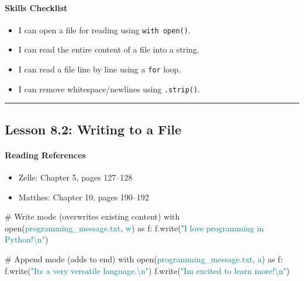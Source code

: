 \documentclass[
  justified,
  openright,
]{tufte-book}
\let\subsubsection\paragraph
\let\paragraph\paragraph
\newcommand{\BuiltInTok}[1]{#1}
\newcommand{\CharTok}[1]{\textcolor{Teal}{#1}}
\newcommand{\CommentTok}[1]{\textcolor{MidGray}{#1}}
\newcommand{\ControlFlowTok}[1]{\textcolor{BrandBlue}{#1}}
\newcommand{\ImportTok}[1]{\textcolor{BrandAccent}{#1}}
\newcommand{\NormalTok}[1]{#1}
\newcommand{\StringTok}[1]{\textcolor{Teal}{#1}}
\newenvironment{Shaded}{%
  \begin{snugshade}
}{%
  \end{snugshade}
}
\let\subsubsection\paragraph
\let\paragraph\paragraph
\providecommand{\tightlist}{%
  \setlength{\itemsep}{0pt}\setlength{\parskip}{0pt}}
\begin{document}
\subsubsection{Skills Checklist}\label{skills-checklist-37}

\begin{itemize}
\tightlist
\item[$\square$]
  I can open a file for reading using \texttt{with\ open()}.
\item[$\square$]
  I can read the entire content of a file into a string.
\item[$\square$]
  I can read a file line by line using a \texttt{for} loop.
\item[$\square$]
  I can remove whitespace/newlines using \texttt{.strip()}.
\end{itemize}

\begin{center}\rule{0.5\linewidth}{0.5pt}\end{center}

\subsection{Lesson 8.2: Writing to a
File}\label{lesson-8.2-writing-to-a-file}

\subsubsection{Reading References}\label{reading-references-24}

\begin{itemize}
\tightlist
\item
  Zelle: Chapter 5, pages 127--128
\item
  Matthes: Chapter 10, pages 190--192
\end{itemize}

\begin{Shaded}
\begin{Highlighting}[]
\CommentTok{\# Write mode (overwrites existing content)}
\ControlFlowTok{with} \BuiltInTok{open}\NormalTok{(}\StringTok{\textquotesingle{}programming\_message.txt\textquotesingle{}}\NormalTok{, }\StringTok{\textquotesingle{}w\textquotesingle{}}\NormalTok{) }\ImportTok{as}\NormalTok{ f:}
\NormalTok{    f.write(}\StringTok{"I love programming in Python!}\CharTok{\textbackslash{}n}\StringTok{"}\NormalTok{)}

\CommentTok{\# Append mode (adds to end)}
\ControlFlowTok{with} \BuiltInTok{open}\NormalTok{(}\StringTok{\textquotesingle{}programming\_message.txt\textquotesingle{}}\NormalTok{, }\StringTok{\textquotesingle{}a\textquotesingle{}}\NormalTok{) }\ImportTok{as}\NormalTok{ f:}
\NormalTok{    f.write(}\StringTok{"It\textquotesingle{}s a very versatile language.}\CharTok{\textbackslash{}n}\StringTok{"}\NormalTok{)}
\NormalTok{    f.write(}\StringTok{"I\textquotesingle{}m excited to learn more!}\CharTok{\textbackslash{}n}\StringTok{"}\NormalTok{)}
\end{Highlighting}
\end{Shaded}
\end{document}
